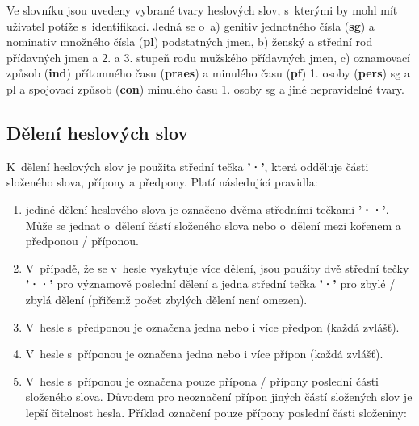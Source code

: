 Ve slovníku jsou uvedeny vybrané tvary heslových slov, s~kterými by mohl mít uživatel potíže s~identifikací. Jedná se o~a) genitiv jednotného čísla ({\textbf{sg}}) a nominativ množného čísla ({\textbf{pl}}) podstatných jmen, b) ženský a střední rod přídavných jmen a 2. a 3. stupeň rodu mužského přídavných jmen, c) oznamovací způsob ({\textbf{ind}}) přítomného času ({\textbf{praes}}) a minulého času ({\textbf{pf}}) 1. osoby ({\textbf{pers}}) sg a pl a spojovací způsob ({\textbf{con}}) minulého času 1. osoby sg a jiné nepravidelné tvary.

\blspace
  \dicEntry {}   
\blspace

\subsection*{Dělení heslových slov}

K~dělení heslových slov je použita střední tečka \textbf{'·'}, která odděluje části složeného slova, přípony a předpony. Platí následující pravidla:

\renewcommand{\labelenumi}{\alph{enumi})}
\begin{enumerate}
\item jediné dělení heslového slova je označeno dvěma středními tečkami \textbf{'··'}. Může se jednat o~dělení částí složeného slova
\blspace
\dicEntry {}
nebo o~dělení mezi kořenem a předponou / příponou.
\dicEntry {}
\blspace
\item V~případě, že se v~hesle vyskytuje více dělení, jsou použity dvě střední tečky \textbf{'··'} pro významově poslední dělení a jedna střední tečka \textbf{'·'} pro zbylé / zbylá dělení (přičemž počet zbylých dělení není omezen).
\blspace
\dicEntry {}
\blspace
\item V~hesle s~předponou je označena jedna nebo i více předpon (každá zvlášť).
\blspace
\dicEntry {}
\blspace
\item V~hesle s~příponou je označena jedna nebo i více přípon (každá zvlášť).
\blspace
\dicEntry {}
\blspace
\item V~hesle s~příponou je označena pouze přípona / přípony poslední části složeného slova. Důvodem pro neoznačení přípon jiných částí složených slov je lepší čitelnost hesla. Příklad označení pouze přípony poslední části složeniny:
\blspace
\dicEntry {}
\end{enumerate}

